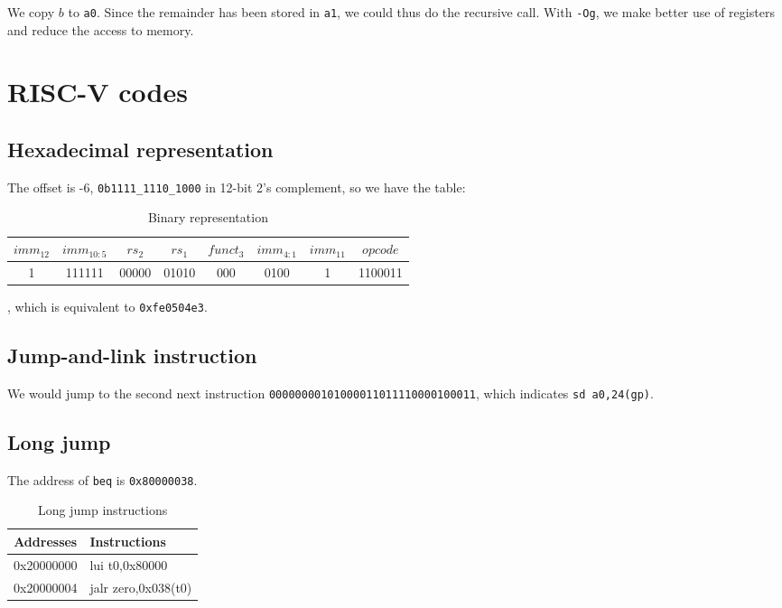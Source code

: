 \documentclass[12pt, a4paper]{article}
\begin{document}
We copy $b$ to \texttt{a0}. Since the remainder has been stored in \texttt{a1}, we could thus do the recursive call. With \texttt{-Og}, we make better use of registers and reduce the access to memory.

\section{RISC-V codes}

\subsection{Hexadecimal representation}

The offset is -6, \texttt{0b1111\_1110\_1000} in 12-bit 2's complement, so we have the table:

\begin{table}[htp]
\caption{Binary representation}
\centering
\begin{tabular}{cccccccc}
\hline
$imm_{12}$ & $imm_{10:5}$ & $rs_2$ & $rs_1$ & $funct_3$ & $imm_{4:1}$ & $imm_{11}$ & $opcode$ \\
\hline\hline
1 & 111111 & 00000 & 01010 & 000 & 0100 & 1 & 1100011 \\
\hline
\end{tabular}
\label{beq}
\end{table}
, which is equivalent to \texttt{0xfe0504e3}.

\subsection{Jump-and-link instruction}

We would jump to the second next instruction \texttt{00000000101000011011110000100011}, which indicates \texttt{sd a0,24(gp)}.

\subsection{Long jump}

The address of \texttt{beq} is \texttt{0x80000038}.

\begin{table}[htp]
\caption{Long jump instructions}
\centering
\ttfamily
\begin{tabular}{cl}
\hline
Addresses & Instructions \\
\hline\hline
0x20000000 & lui t0,0x80000 \\
0x20000004 & jalr zero,0x038(t0) \\
\hline
\end{tabular}
\label{long jump}
\end{table}
\end{document}
